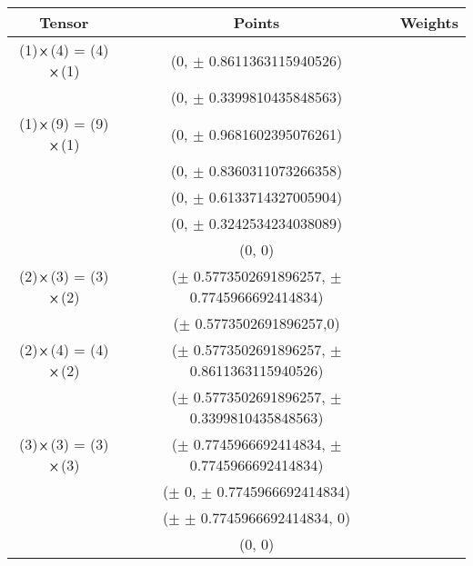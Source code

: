 \documentclass[11pt]{article}
\begin{document}
\begin{table}[H]
  \centering
  \begin{tabular}{c c c}
    Tensor & Points & Weights \\ \hline
    (1)$\cross$(4) = (4)$\cross$(1)  & (0, $\pm$ 0.8611363115940526) &  \\
                                     & (0, $\pm$ 0.3399810435848563) & \\ \hline
    (1)$\cross$(9) = (9)$\cross$(1)  & (0, $\pm$  0.9681602395076261) & \\
                                     & (0, $\pm$ 0.8360311073266358) & \\
                                     & (0, $\pm$ 0.6133714327005904) & \\
                                     & (0, $\pm$ 0.3242534234038089) & \\
                                     & (0, 0) & \\ \hline
    (2)$\cross$(3) = (3)$\cross$(2)  & ($\pm$ 0.5773502691896257, $\pm$ 0.7745966692414834) & \\
                                     & ($\pm$ 0.5773502691896257,0) & \\
    (2)$\cross$(4) = (4)$\cross$(2)  & ($\pm$ 0.5773502691896257, $\pm$ 0.8611363115940526) & \\
                                     & ($\pm$ 0.5773502691896257, $\pm$ 0.3399810435848563) & \\
    (3)$\cross$(3) = (3)$\cross$(3)  & ($\pm$ 0.7745966692414834, $\pm$ 0.7745966692414834) & \\
                                     & ($\pm$ 0, $\pm$ 0.7745966692414834) & \\
                                     & ($\pm$ $\pm$ 0.7745966692414834, 0) & \\
                                     & (0, 0) & \\
  \end{tabular}
\end{table}
\end{document}
